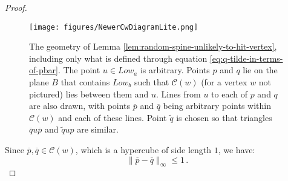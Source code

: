 \documentclass[11pt]{article}
\begin{document}
\begin{proof}
\begin{figure}[h!]
    \centering 
    \texttt{[image: figures/NewerCwDiagramLite.png]}
    \caption{The geometry of Lemma \ref{lem:random-spine-unlikely-to-hit-vertex}, including only what is defined through equation \eqref{eq:q-tilde-in-terms-of-pbar}. The point $u \in Low_a$ is arbitrary. Points $p$ and $q$ lie on the plane $B$ that contains $Low_b$ such that $\mathcal{C}(w)$ (for a vertex $w$ not pictured) lies between them and $u$. Lines from $u$ to each of $p$ and $q$ are also drawn, with points $\overline{p}$ and $\overline{q}$ being arbitrary points within $\mathcal{C}(w)$ and each of these lines. Point $\widetilde{q}$ is chosen so that triangles $\overline{q}u\overline{p}$ and $\widetilde{q}up$ are similar.}
    \label{fig:random-spine-lemma-geometry-lite}
\end{figure}

    Since  $\overline{p}, \overline{q} \in \mathcal{C}(w)$, which is a hypercube of side length $1$, we have:
    \begin{equation}\label{eq:p-q-norm-leq-1}
        \|\overline{p} - \overline{q}\|_{\infty} \leq 1\,.
    \end{equation}

    

\end{proof}
\end{document}

